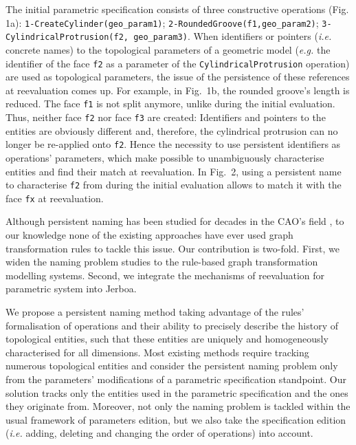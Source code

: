 The initial parametric specification consists of three constructive operations (Fig. 1a):
\texttt{1-CreateCylinder(geo\_param1)}; \texttt{2-RoundedGroove(f1,geo\_param2)}; \texttt{3-Cy\-lin\-dri\-cal\-Pro\-tru\-sion(f2, geo\_param3)}.
When identifiers
or pointers (\textit{i.e.} concrete names) to the topological parameters of a geometric
model (\textit{e.g.} the identifier of the face \verb+f2+ as a parameter of
the \verb+CylindricalProtrusion+ operation) are used as topological
parameters, the issue of the persistence of these references at
reevaluation comes up. For example, in Fig.~1b,
the rounded groove’s length is reduced. The
face \verb+f1+ is not split anymore, unlike  during
the initial evaluation. Thus, neither face \verb+f2+ nor face \verb+f3+ are created:  Identifiers and pointers to the entities are obviously different and, therefore, the cylindrical protrusion can
no longer be re-applied onto \verb+f2+.
Hence the necessity to use persistent
identifiers as operations’ parameters, which make possible to
unambiguously characterise entities and find their match at
reevaluation. In Fig.~2, using a persistent name to characterise
 \verb+f2+ from during the initial evaluation  allows to match it with the face \verb+fx+ at reevaluation.

Although persistent naming has been studied for decades in the CAO's
  field \cite{KRIPAC1997,CAPOYLEAS199617,wu2001face,wang2005geometry,bidarra2005feature,mun05,mar06,baba10,xue16,farjana2018mechanisms},
  to our knowledge none of the existing approaches have ever used graph transformation rules to tackle this issue. %
Our contribution is two-fold. First, we widen the naming
problem studies to the rule-based graph transformation modelling systems. Second, we integrate
the mechanisms of reevaluation for parametric system into
Jerboa.

We propose a persistent
naming method taking advantage of the rules’ formalisation
of operations and their ability to precisely describe the history
of topological entities, such that these entities are uniquely and
homogeneously characterised for all dimensions.  Most existing methods require  tracking
  numerous topological entities and consider the persistent naming problem only
  from the parameters' modifications of a parametric specification standpoint\cite{KRIPAC1997, chen1995editability, wu2001face}. Our solution tracks
only the entities used in the parametric specification and the
ones they originate from. Moreover, not only the naming problem is tackled within the usual framework of  parameters edition, but we also take the specification edition (\textit{i.e.} adding, deleting and changing the order of operations) into account.


